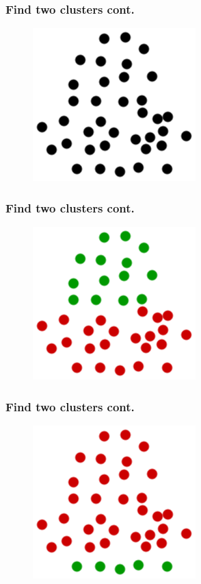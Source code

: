 \documentclass{beamer}
\begin{document}
  \begin{frame}%
    \frametitle{Find two clusters cont.} 
    \begin{figure}
      \includegraphics[scale=.5]{graphics/presentation/clusters2} 
    \end{figure}
  \end{frame}

  \begin{frame}%
    \frametitle{Find two clusters cont.} 
    \begin{figure}
      \includegraphics[scale=.5]{graphics/presentation/clusters2a} 
    \end{figure}
  \end{frame}

  \begin{frame}%
    \frametitle{Find two clusters cont.} 
    \begin{figure}
      \includegraphics[scale=.5]{graphics/presentation/clusters2b} 
    \end{figure}
  \end{frame}
\end{document}
